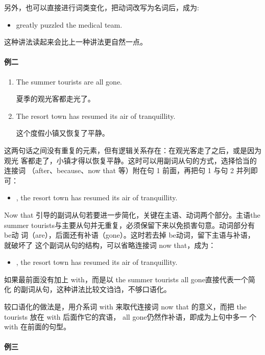 另外，也可以直接进行词类变化，把动词改写为名词后，成为:
\begin{itemize}
\item {} greatly
  puzzled the medical team.
\end{itemize}

这种讲法读起来会比上一种讲法更自然一点。

\paragraph{例二}

\begin{enumerate}
\item The summer tourists are all gone.

  夏季的观光客都走光了。
\item The resort town has resumed its air of tranquillity.

  这个度假小镇又恢复了平静。
\end{enumerate}

这两句话之间没有重复的元素，但有逻辑关系存在：在观光客走了之后，或是因为观光
客都走了，小镇才得以恢复平静。这时可以用副词从句的方式，选择恰当的连接词
（after、because、now that 等）附在句 1 前面，再把句 1 与句 2 并列即可：
\begin{itemize}
\item {}, the resort town has
  resumed its air of tranquillity.
\end{itemize}
Now that 引导的副词从句若要进一步简化，关键在主语、动词两个部分。主语the
summer tourists与主要从句并无重复，必须保留下来以免损害句意。动词部分有 be动
词（are），后面还有补语（gone）。这时若去掉 be动词，留下主语与补语，就破坏了
这个副词从句的结构，可以省略连接词 now that，成为：
\begin{itemize}
\item {}, the resort town has resumed its air of tranquillity.
\end{itemize}
如果最前面没有加上 with，而是以 the summer tourists all gone直接代表一个简化
的副词从句，这种讲法比较文诌诌，不够口语化。

较口语化的做法是，用介系词 with 来取代连接词 now that 的意义，而把 the
tourists 放在 with 后面作它的宾语， all gone仍然作补语，即成为上句中多一
个 with 在前面的句型。

\paragraph{例三}

